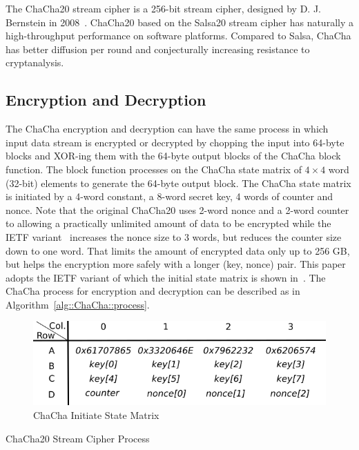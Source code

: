 The ChaCha20 stream cipher is a 256-bit stream cipher, designed by D. J. Bernstein in 2008~\cite{Ber:08}.
ChaCha20 based on the Salsa20 stream cipher has naturally a high-throughput performance on software platforms.
Compared to Salsa, ChaCha has better diffusion per round and conjecturally increasing resistance to cryptanalysis. 

\subsection{Encryption and Decryption}
The ChaCha encryption and decryption can have the same process in which input data stream is encrypted or decrypted by chopping the input into 64-byte blocks and XOR-ing them with the 64-byte output blocks of the ChaCha block function. The block function processes on the ChaCha state matrix of $4\times4$ word (32-bit) elements to generate the 64-byte output block.
The ChaCha state matrix is initiated by a 4-word constant, a 8-word secret key, 4 words of counter and nonce. 
Note that the original ChaCha20 uses 2-word nonce and a 2-word counter to allowing a practically unlimited amount of data to be encrypted while the IETF variant~\cite{} increases the nonce size to 3 words, but reduces the counter size down to one word.
That limits the amount of encrypted data only up to 256 GB, but helps the encryption more safely with a longer (key, nonce) pair. 
This paper adopts the IETF variant of which the initial state matrix is shown in~.
The ChaCha process for encryption and decryption can be described as in Algorithm~\ref{alg::ChaCha::process}.

\begin{figure}
	\centering
	\includegraphics[scale=0.47]{figures/ChaChaState.png}
	\caption{ChaCha Initiate State Matrix}
	\label{fig:bg:ChaChaMatix}
\end{figure}

\begin{algorithm}
	\BlankLine
	\caption{ChaCha20 Stream Cipher Process}
	\label{alg::ChaCha::process}
\end{algorithm}

